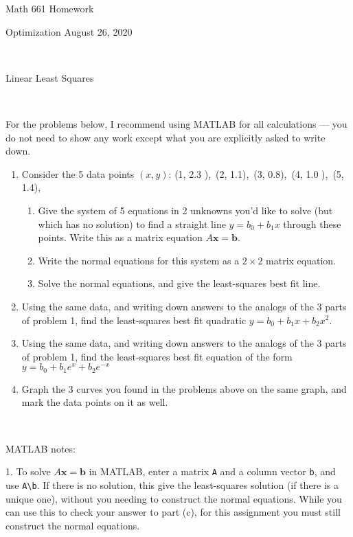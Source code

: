 \documentclass[12pt]{report}
\begin{document}
\thispagestyle{empty}

\noindent Math 661   \hfill  Homework

\noindent Optimization \hfill August 26, 2020

\ 

\centerline{Linear Least Squares}

\ 

For the problems below, I recommend using MATLAB for all calculations --- you do not need to show any work except what you are explicitly asked to write down.

\begin{enumerate}
\item Consider the 5 data points $(x,y)$:
(1, 2.3 ),\ 
(2, 1.1),\
(3, 0.8),\
(4, 1.0 ),\
(5, 1.4),\

\begin{enumerate}
\item Give the system of 5 equations in 2 unknowns you'd like to solve (but which has no solution) to find a straight line $y=b_0 +b_1x$ through these points. Write this as a matrix
equation $A\mathbf x=\mathbf b$.
\item Write the normal equations for this system as a $2\times 2$ matrix equation.
\item Solve the normal equations, and give the least-squares best fit line.

\end{enumerate}

\item Using the same data, and writing down answers to the analogs of the 3 parts of problem 1, find the least-squares best fit quadratic  $y=b_0 +b_1x+ b_2x^2$.

\item Using the same data, and writing down answers to the analogs of the 3 parts of problem 1, find the least-squares best fit equation of the form  $y=b_0 +b_1 e^x+ b_2e^{-x}$

\item Graph the 3 curves you found in the problems above on the same graph, and mark the  data points on it as well. 



\end{enumerate}

\ 

\noindent
MATLAB notes: 

1. To solve  $A\mathbf x=\mathbf b$ in MATLAB, enter a matrix {\tt A} and a column vector {\tt b}, and use {\tt A\textbackslash b}. If there is no solution, this give the least-squares solution (if there is a unique one), without you needing to construct the normal equations. While you can use this to check your answer to part (c), for this assignment you must still construct the normal equations.
\end{document}
